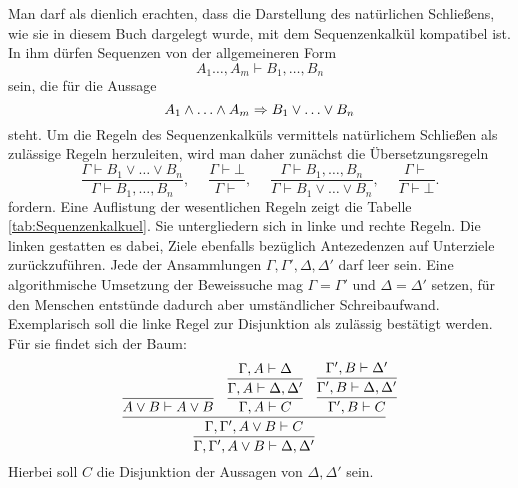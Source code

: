Man darf als dienlich erachten, dass die Darstellung des natürlichen
Schließens, wie sie in diesem Buch dargelegt wurde, mit dem
Sequenzenkalkül kompatibel ist. In ihm dürfen Sequenzen von der
allgemeineren Form
\[A_1\ldots,A_m\vdash B_1,\ldots,B_n\]
sein, die für die Aussage
\[A_1\land\ldots\land A_m\Rightarrow B_1\lor\ldots\lor B_n\]
steht. Um die Regeln des Sequenzenkalküls vermittels natürlichem Schließen
als zulässige Regeln herzuleiten, wird man daher zunächst die
Übersetzungsregeln
\[\dfrac{\Gamma\vdash B_1\lor\ldots\lor B_n}{\Gamma\vdash B_1,\ldots,B_n},\quad\;
\dfrac{\Gamma\vdash\bot}{\Gamma\vdash},\quad\;
\dfrac{\Gamma\vdash B_1,\ldots,B_n}{\Gamma\vdash B_1\lor\ldots\lor B_n},\quad\;
\dfrac{\Gamma\vdash}{\Gamma\vdash\bot}.\]
fordern. Eine Auflistung der wesentlichen Regeln zeigt die Tabelle
\ref{tab:Sequenzenkalkuel}. Sie untergliedern sich in linke und rechte
Regeln. Die linken gestatten es dabei, Ziele ebenfalls bezüglich
Antezedenzen auf Unterziele zurückzuführen. Jede der Ansammlungen
$\Gamma,\Gamma',\Delta,\Delta'$ darf leer sein. Eine algorithmische
Umsetzung der Beweissuche mag $\Gamma=\Gamma'$ und $\Delta=\Delta'$
setzen, für den Menschen entstünde dadurch aber umständlicher
Schreibaufwand. Exemplarisch soll die linke Regel zur Disjunktion als
zulässig bestätigt werden. Für sie findet sich der Baum:
\[
\infer{\Gamma,\Gamma',A\lor B\vdash \Delta,\Delta'}{
  \infer{\Gamma,\Gamma',A\lor B\vdash C}{
    \infer{A\lor B\vdash A\lor B}{}
  & \infer{\Gamma,A\vdash C}{
      \infer{\Gamma,A\vdash\Delta,\Delta'}{
        \Gamma,A\vdash\Delta}}
  & \infer{\Gamma',B\vdash C}{
      \infer{\Gamma',B\vdash\Delta,\Delta'}{
        \Gamma',B\vdash\Delta'}}}}
\]
Hierbei soll $C$ die Disjunktion der Aussagen von $\Delta,\Delta'$ sein.

